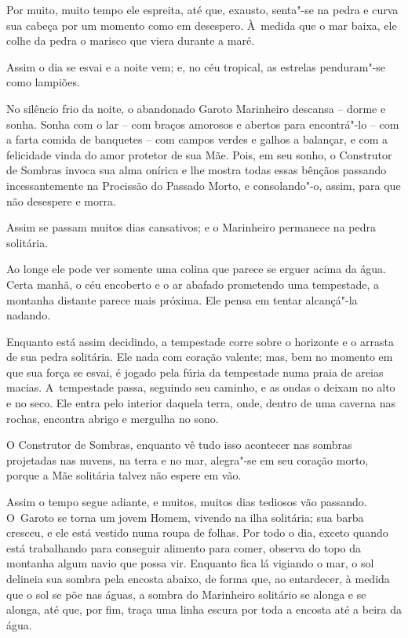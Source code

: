 Por muito, muito tempo ele espreita, até que, exausto, senta"-se na pedra
e curva sua cabeça por um momento como em desespero. À~medida que o
mar baixa, ele colhe da pedra o marisco que viera durante a maré.

Assim o dia se esvai e a noite vem; e, no céu tropical, as estrelas
penduram"-se como lampiões.

No silêncio frio da noite, o abandonado Garoto Marinheiro descansa --
dorme e sonha. Sonha com o lar -- com braços amorosos e abertos
para encontrá"-lo -- com a farta comida de banquetes -- com campos verdes e
galhos a balançar, e com a felicidade vinda do amor protetor de sua Mãe.
Pois, em seu sonho, o Construtor de Sombras invoca sua alma onírica e
lhe mostra todas essas bênçãos passando incessantemente na Procissão do
Passado Morto, e consolando"-o, assim, para que não desespere e morra.


Assim se passam muitos dias cansativos; e o Marinheiro permanece na
pedra solitária.

Ao longe ele pode ver somente uma colina que parece se erguer acima da
água. Certa manhã, o céu encoberto e o ar abafado prometendo uma
tempestade, a montanha distante parece mais próxima. Ele pensa em
tentar alcançá"-la nadando.

Enquanto está assim decidindo, a tempestade corre sobre o horizonte e o
arrasta de sua pedra solitária. Ele nada com coração valente; mas, bem
no momento em que sua força se esvai, é jogado pela fúria da tempestade
numa praia de areias macias. A~tempestade passa, seguindo seu caminho, e
as ondas o deixam no alto e no seco. Ele entra pelo interior daquela
terra, onde, dentro de uma caverna nas rochas, encontra abrigo e
mergulha no sono.

O Construtor de Sombras, enquanto vê tudo isso acontecer nas sombras
projetadas nas nuvens, na terra e no mar, alegra"-se em seu coração
morto, porque a Mãe solitária talvez não espere em vão.

\smallskip
Assim o tempo segue adiante, e muitos, muitos dias tediosos vão
passando. O~Garoto se torna um jovem Homem, vivendo na ilha solitária;
sua barba cresceu, e ele está vestido numa roupa de folhas. Por todo o
dia, exceto quando está trabalhando para conseguir alimento para comer,
observa do topo da montanha algum navio que possa vir. Enquanto fica lá
vigiando o mar, o sol delineia sua sombra pela encosta abaixo, de forma
que, ao entardecer, à medida que o sol se põe nas águas, a sombra do
Marinheiro solitário se alonga e se alonga, até que, por fim, traça uma
linha escura por toda a encosta até a beira da água.

